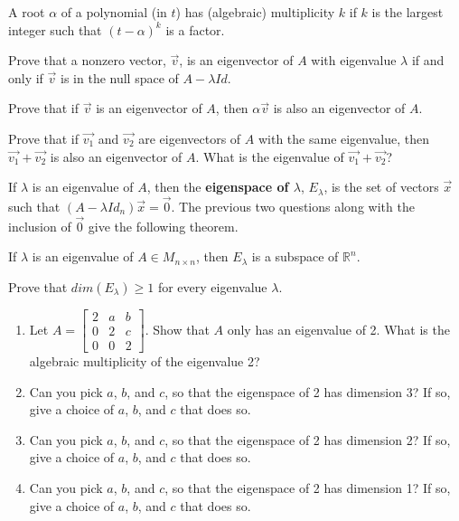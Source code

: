 A root $\alpha$ of a polynomial (in $t$) has (algebraic) multiplicity $k$ if $k$ is the largest integer such that $(t-\alpha)^k$ is a factor.

\bq Prove that a nonzero vector, $\vec{v}$, is an eigenvector of $A$ with eigenvalue $\lambda$ if and only if $\vec{v}$ is in the null space of $A-\lambda Id$.
\eq

\bq Prove that if $\vec{v}$ is an eigenvector of $A$, then $\alpha \vec{v}$ is also an eigenvector of $A$.
\eq

\bq Prove that if $\vec{v_1}$ and $\vec{v_2}$ are eigenvectors of $A$ with the same eigenvalue, then $\vec{v_1}+\vec{v_2}$ is also an eigenvector of $A$. What is the eigenvalue of $\vec{v_1}+\vec{v_2}$?
\eq

If $\lambda$ is an eigenvalue of $A$, then the \textbf{eigenspace of $\lambda$}, $E_\lambda$, is the set of vectors $\vec{x}$ such that $(A-\lambda Id_n)\vec{x}=\vec{0}$. The previous two questions along with the inclusion of $\vec{0}$ give the following theorem.

\begin{theorem} If $\lambda$ is an eigenvalue of $A \in M_{n \times n}$, then $E_\lambda$ is a subspace of $\mathbb{R}^n$.
\end{theorem}

\bq Prove that $dim(E_\lambda) \geq 1$ for every eigenvalue $\lambda$.
\eq

\question \begin{enumerate} \item Let $A =\begin{bmatrix} 2 &a&b\\0&2&c\\0&0&2 \end{bmatrix}$. Show that $A$ only has an eigenvalue of 2. What is the algebraic multiplicity of the eigenvalue 2?
\item Can you pick $a$, $b$, and $c$, so that the eigenspace of 2 has dimension 3? If so, give a choice of $a$, $b$, and $c$ that does so.
\item Can you pick $a$, $b$, and $c$, so that the eigenspace of 2 has dimension 2? If so, give a choice of $a$, $b$, and $c$ that does so.
\item Can you pick $a$, $b$, and $c$, so that the eigenspace of 2 has dimension 1? If so, give a choice of $a$, $b$, and $c$ that does so.
\end{enumerate}

